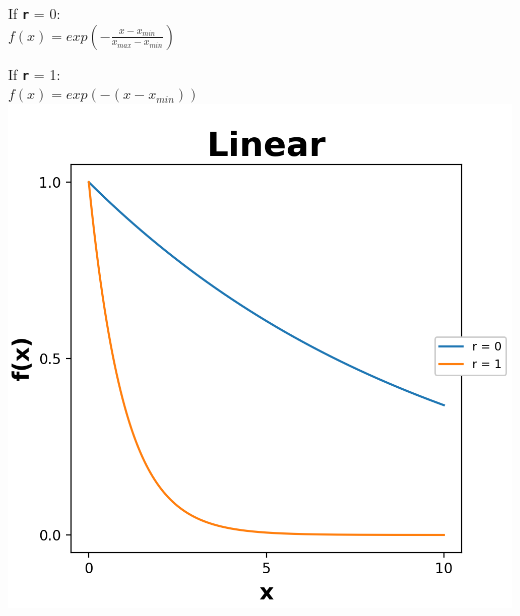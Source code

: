 \documentclass[12pt, a4paper, titlepage, openany]{book}
\begin{document}
\begin{description}[labelsep=1cm, labelwidth=2cm, nosep,,style=multiline,leftmargin=3cm]
\begin{description}[labelsep=14em, labelwidth=10em, nosep,style=multiline,leftmargin=6cm]
	\item[\texttt{"linear"}]	If \texttt{\textbf{r}} = 0: \\
	$f(x) = exp(-\frac{x - x_{min}}{x_{max} - x_{min}}) $
	\item[]			If \texttt{\textbf{r}} = 1: \\ $f(x) = exp(-(x - x_{min}))$\\
		\includegraphics[scale=.5]{Fuzz4.png}
	\end{description}
	

\end{description}
\end{document}
